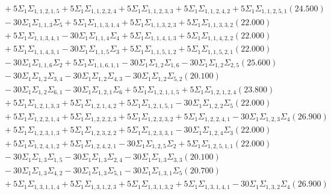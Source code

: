 \documentclass[12pt]{article}
\begin{document}
\begin{landscape}
\begin{align*}
		&\quad\quad +5\Sigma_{1}\Sigma_{1,1,2,1,5}+5\Sigma_{1}\Sigma_{1,1,2,2,4}+5\Sigma_{1}\Sigma_{1,1,2,3,3}+5\Sigma_{1}\Sigma_{1,1,2,4,2}+5\Sigma_{1}\Sigma_{1,1,2,5,1}(24.500) \\ 
		&\quad\quad -30\Sigma_{1}\Sigma_{1,1,3}\Sigma_{5}+5\Sigma_{1}\Sigma_{1,1,3,1,4}+5\Sigma_{1}\Sigma_{1,1,3,2,3}+5\Sigma_{1}\Sigma_{1,1,3,3,2}(22.000) \\ 
		&\quad\quad +5\Sigma_{1}\Sigma_{1,1,3,4,1}-30\Sigma_{1}\Sigma_{1,1,4}\Sigma_{4}+5\Sigma_{1}\Sigma_{1,1,4,1,3}+5\Sigma_{1}\Sigma_{1,1,4,2,2}(22.000) \\ 
		&\quad\quad +5\Sigma_{1}\Sigma_{1,1,4,3,1}-30\Sigma_{1}\Sigma_{1,1,5}\Sigma_{3}+5\Sigma_{1}\Sigma_{1,1,5,1,2}+5\Sigma_{1}\Sigma_{1,1,5,2,1}(22.000) \\ 
		&\quad\quad -30\Sigma_{1}\Sigma_{1,1,6}\Sigma_{2}+5\Sigma_{1}\Sigma_{1,1,6,1,1}-30\Sigma_{1}\Sigma_{1,2}\Sigma_{1,6}-30\Sigma_{1}\Sigma_{1,2}\Sigma_{2,5}(25.600) \\ 
		&\quad\quad -30\Sigma_{1}\Sigma_{1,2}\Sigma_{3,4}-30\Sigma_{1}\Sigma_{1,2}\Sigma_{4,3}-30\Sigma_{1}\Sigma_{1,2}\Sigma_{5,2}(20.100) \\ 
		&\quad\quad -30\Sigma_{1}\Sigma_{1,2}\Sigma_{6,1}-30\Sigma_{1}\Sigma_{1,2,1}\Sigma_{6}+5\Sigma_{1}\Sigma_{1,2,1,1,5}+5\Sigma_{1}\Sigma_{1,2,1,2,4}(23.800) \\ 
		&\quad\quad +5\Sigma_{1}\Sigma_{1,2,1,3,3}+5\Sigma_{1}\Sigma_{1,2,1,4,2}+5\Sigma_{1}\Sigma_{1,2,1,5,1}-30\Sigma_{1}\Sigma_{1,2,2}\Sigma_{5}(22.000) \\ 
		&\quad\quad +5\Sigma_{1}\Sigma_{1,2,2,1,4}+5\Sigma_{1}\Sigma_{1,2,2,2,3}+5\Sigma_{1}\Sigma_{1,2,2,3,2}+5\Sigma_{1}\Sigma_{1,2,2,4,1}-30\Sigma_{1}\Sigma_{1,2,3}\Sigma_{4}(26.900) \\ 
		&\quad\quad +5\Sigma_{1}\Sigma_{1,2,3,1,3}+5\Sigma_{1}\Sigma_{1,2,3,2,2}+5\Sigma_{1}\Sigma_{1,2,3,3,1}-30\Sigma_{1}\Sigma_{1,2,4}\Sigma_{3}(22.000) \\ 
		&\quad\quad +5\Sigma_{1}\Sigma_{1,2,4,1,2}+5\Sigma_{1}\Sigma_{1,2,4,2,1}-30\Sigma_{1}\Sigma_{1,2,5}\Sigma_{2}+5\Sigma_{1}\Sigma_{1,2,5,1,1}(22.000) \\ 
		&\quad\quad -30\Sigma_{1}\Sigma_{1,3}\Sigma_{1,5}-30\Sigma_{1}\Sigma_{1,3}\Sigma_{2,4}-30\Sigma_{1}\Sigma_{1,3}\Sigma_{3,3}(20.100) \\ 
		&\quad\quad -30\Sigma_{1}\Sigma_{1,3}\Sigma_{4,2}-30\Sigma_{1}\Sigma_{1,3}\Sigma_{5,1}-30\Sigma_{1}\Sigma_{1,3,1}\Sigma_{5}(20.700) \\ 
		&\quad\quad +5\Sigma_{1}\Sigma_{1,3,1,1,4}+5\Sigma_{1}\Sigma_{1,3,1,2,3}+5\Sigma_{1}\Sigma_{1,3,1,3,2}+5\Sigma_{1}\Sigma_{1,3,1,4,1}-30\Sigma_{1}\Sigma_{1,3,2}\Sigma_{4}(26.900) \\ 

\end{align*}
\end{landscape}
\end{document}
